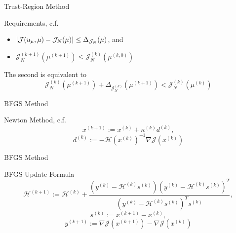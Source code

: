 \begin{frame}{Trust-Region Method}
    \begin{block}{Requirements, c.f.~\cite{Qian2017}}
        \begin{itemize}
            \item $\left\lvert\mathcal{J}(u_\mu, \mu) - \mathcal{J}_N(\mu)\right\rvert_{} \leq \Delta_{\mathcal{J}_N}(\mu)$, and
            \item $\mathcal{J}_N^{(k + 1)}(\mu^{(k + 1)}) \leq \mathcal{J}_N^{(k)}(\mu^{(k, 0)})$
        \end{itemize}
    \end{block}

    The second is equivalent to
    \begin{equation*}
        \mathcal{J}_N^{(k)}(\mu^{(k + 1)}) + \Delta_{\mathcal{J}_N^{(k)}}(\mu^{(k + 1)}) < \mathcal{J}_N^{(k)}(\mu^{(k)})
    \end{equation*}
\end{frame}

\begin{frame}{BFGS Method}
    \begin{block}{Newton Method, c.f.~\cite{Nocedal2006}}
        \vspace*{-8pt}
        \[ x^{(k + 1)} := x^{(k)} + \kappa^{(k)} d^{(k)}, \]
        \[ d^{(k)} := - {\mathcal{H}(x^{(k)})}^{-1} \nabla \mathcal{J}(x^{(k)}) \]
    \end{block}

\end{frame}

\begin{frame}{BFGS Method}
    \begin{block}{BFGS Update Formula}
        \vspace*{-8pt}
        \[ \mathcal{H}^{(k + 1)} := \mathcal{H}^{(k)} + \frac{(y^{(k)} - \mathcal{H}^{(k)} s^{(k)}){(y^{(k)} - \mathcal{H}^{(k)} s^{(k)})}^T}{{(y^{(k)} - \mathcal{H}^{(k)} s^{(k)})}^T s^{(k)}}, \]
        \[ s^{(k)} := x^{(k + 1)} - x^{(k)}, \]
        \[ y^{(k + 1)} := \nabla \mathcal{J}(x^{(k + 1)}) - \nabla \mathcal{J}(x^{(k)}) \]
    \end{block}
\end{frame}